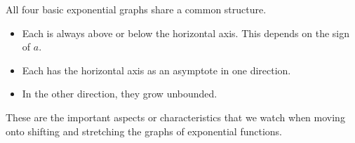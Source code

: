 \documentclass{ximera}
\begin{document}
All four basic exponential graphs share a common structure.


\begin{itemize}
\item Each is always above or below the horizontal axis. This depends on the sign of $a$.
\item Each has the horizontal axis as an asymptote in one direction.
\item In the other direction, they grow unbounded. 
\end{itemize}




These are the important aspects or characteristics that we watch when moving onto shifting and stretching the graphs of exponential functions.
\end{document}
